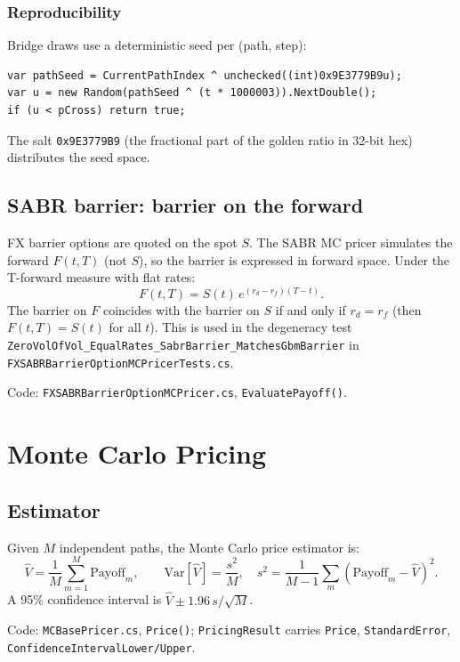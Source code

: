 \documentclass[11pt,a4paper]{article}
\newcommand{\coderef}[1]{\texttt{\color{blue!60!black}#1}}
\theoremstyle{definition}
\begin{document}
\subsubsection{Reproducibility}

Bridge draws use a deterministic seed per (path, step):
\begin{lstlisting}
var pathSeed = CurrentPathIndex ^ unchecked((int)0x9E3779B9u);
var u = new Random(pathSeed ^ (t * 1000003)).NextDouble();
if (u < pCross) return true;
\end{lstlisting}
The salt \texttt{0x9E3779B9} (the fractional part of the golden ratio in
32-bit hex) distributes the seed space.

\subsection{SABR barrier: barrier on the forward}

FX barrier options are quoted on the spot $S$.  The SABR MC pricer simulates
the forward $F(t,T)$ (not $S$), so the barrier is expressed in forward
space.  Under the T-forward measure with flat rates:
\[
  F(t,T) = S(t)\,e^{(r_d-r_f)(T-t)}.
\]
The barrier on $F$ coincides with the barrier on $S$ if and only if $r_d=r_f$
(then $F(t,T)=S(t)$ for all $t$).  This is used in the degeneracy test
\texttt{ZeroVolOfVol\_EqualRates\_SabrBarrier\_MatchesGbmBarrier} in
\coderef{FXSABRBarrierOptionMCPricerTests.cs}.

Code: \coderef{FXSABRBarrierOptionMCPricer.cs}, \texttt{EvaluatePayoff()}.

\section{Monte Carlo Pricing}
\label{sec:mc}

\subsection{Estimator}

Given $M$ independent paths, the Monte Carlo price estimator is:
\[
  \hat V = \frac{1}{M}\sum_{m=1}^M \mathrm{Payoff}_m,
  \qquad \mathrm{Var}[\hat V] = \frac{s^2}{M},
  \quad s^2=\frac{1}{M-1}\sum_m(\mathrm{Payoff}_m-\hat V)^2.
\]
A 95\% confidence interval is $\hat V\pm 1.96\,s/\sqrt{M}$.

Code: \coderef{MCBasePricer.cs}, \texttt{Price()};
\coderef{PricingResult} carries \texttt{Price}, \texttt{StandardError},
\texttt{ConfidenceIntervalLower/Upper}.
\end{document}
